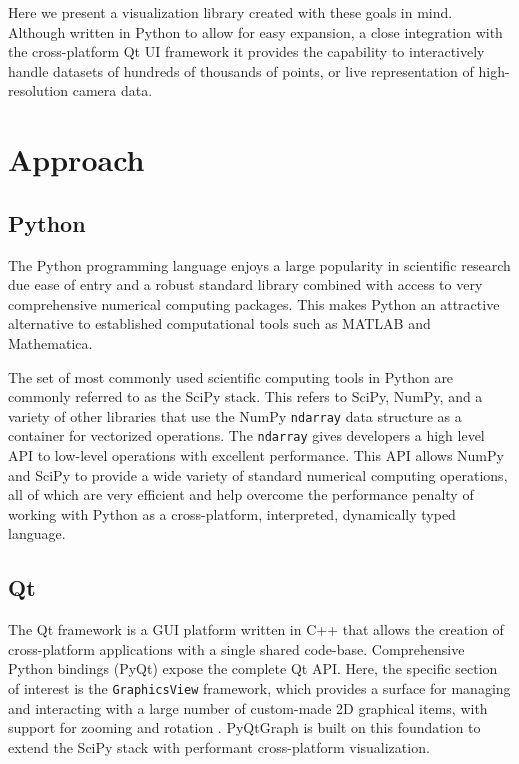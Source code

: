 Here we present a visualization library created with these goals in mind. Although written in Python to allow for easy expansion, a close integration with the cross-platform Qt UI framework \citep{Qt} it provides the capability to interactively handle datasets of hundreds of thousands of points, or live representation of high-resolution camera data.

\makeBasicPlottingFig

\section{Approach}
\subsection{Python}
The Python programming language enjoys a large popularity in scientific research due ease of entry and a robust standard library combined with access to very comprehensive numerical computing packages. This makes Python an attractive alternative to established computational tools such as MATLAB \citep{matlab} and Mathematica. %

The set of most commonly used scientific computing tools in Python are commonly referred to as the SciPy stack. %
This refers to SciPy, NumPy, and a variety of other libraries that use the NumPy \texttt{ndarray} data structure as a container for vectorized operations. The \texttt{ndarray} gives developers a high level API to low-level operations with excellent performance. This API allows NumPy and SciPy to provide a wide variety of standard numerical computing operations, all of which are very efficient and help overcome the performance penalty of working with Python as a cross-platform, interpreted, dynamically typed language.

\subsection{Qt}
The Qt framework is a GUI platform written in C++ that allows the creation of cross-platform applications with a single shared code-base. Comprehensive Python bindings (PyQt) expose the complete Qt API. Here, the specific section of interest is the \texttt{GraphicsView} framework, which provides a surface for managing and interacting with a large number of custom-made 2D graphical items, with support for zooming and rotation \citep{QtGraphicsView}. PyQtGraph is built on this foundation to extend the SciPy stack with performant cross-platform visualization.


